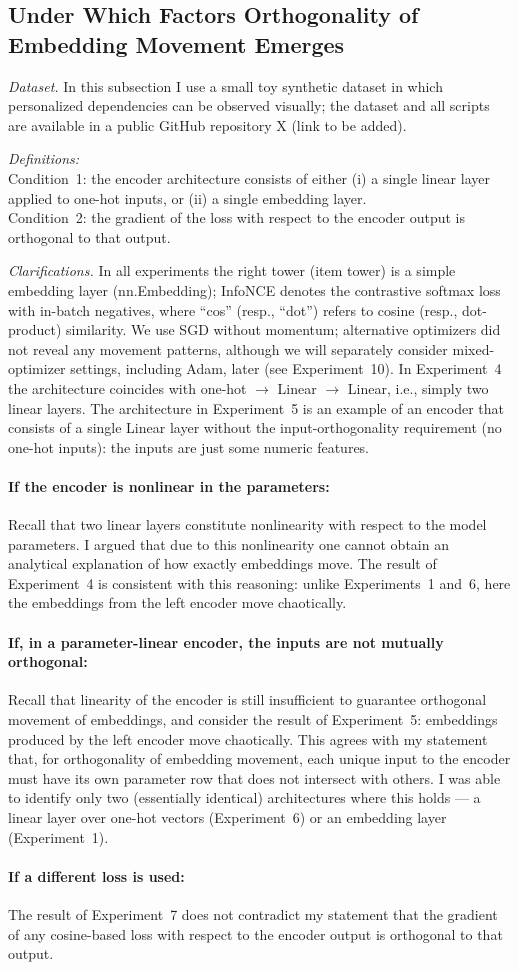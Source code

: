 \subsection{Under Which Factors Orthogonality of Embedding Movement Emerges}

\textit{Dataset.} In this subsection I use a small toy synthetic dataset in which personalized dependencies can be observed visually; the dataset and all scripts are available in a public GitHub repository X (link to be added).

\textit{Definitions:}\\
Condition~1: the encoder architecture consists of either (i) a single linear layer applied to one-hot inputs, or (ii) a single embedding layer.\\ 
Condition~2: the gradient of the loss with respect to the encoder output is orthogonal to that output.

\textit{Clarifications.} In all experiments the right tower (item tower) is a simple embedding layer (nn.Embedding); InfoNCE denotes the contrastive softmax loss with in-batch negatives, where ``cos'' (resp., ``dot'') refers to cosine (resp., dot-product) similarity. We use SGD without momentum; alternative optimizers did not reveal any movement patterns, although we will separately consider mixed-optimizer settings, including Adam, later (see Experiment~10). In Experiment~4 the architecture coincides with one-hot $\to$ Linear $\to$ Linear, i.e., simply two linear layers. The architecture in Experiment~5 is an example of an encoder that consists of a single Linear layer without the input-orthogonality requirement (no one-hot inputs): the inputs are just some numeric features.

\paragraph{If the encoder is nonlinear in the parameters:}
Recall that two linear layers constitute nonlinearity with respect to the model parameters. I argued that due to this nonlinearity one cannot obtain an analytical explanation of how exactly embeddings move. The result of Experiment~4 is consistent with this reasoning: unlike Experiments~1 and~6, here the embeddings from the left encoder move chaotically.

\paragraph{If, in a parameter-linear encoder, the inputs are not mutually orthogonal:}
Recall that linearity of the encoder is still insufficient to guarantee orthogonal movement of embeddings, and consider the result of Experiment~5: embeddings produced by the left encoder move chaotically. This agrees with my statement that, for orthogonality of embedding movement, each unique input to the encoder must have its own parameter row that does not intersect with others. I was able to identify only two (essentially identical) architectures where this holds — a linear layer over one-hot vectors (Experiment~6) or an embedding layer (Experiment~1).

\paragraph{If a different loss is used:}
The result of Experiment~7 does not contradict my statement that the gradient of any cosine-based loss with respect to the encoder output is orthogonal to that output.

